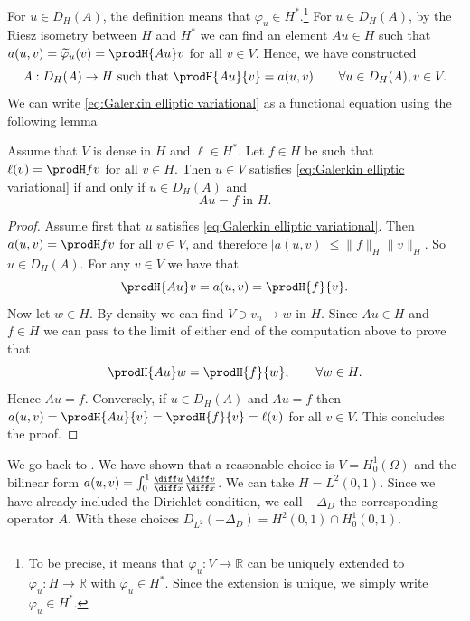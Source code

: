 For $u \in D_H(A)$, the definition means that $\varphi_u \in H^*$.\footnote{To be precise, it means that $\varphi_u : V \to \mathbb R$ can be uniquely extended to $ \widetilde \varphi_u : H \to \mathbb R$ with $\widetilde \varphi_u \in H^*$. Since the extension is unique, we simply write $\varphi_u \in H^*$.}
For $u \in D_H(A)$, by the Riesz isometry between $H$ and $H^*$ we can find an element $Au \in H$ such that $a(u,v) = \widetilde \varphi_u(v) = \prodH {Au} v$ for all $v \in V$. Hence, we have constructed
\begin{equation*}
    A : D_H(A) \to H \text{ such that } \prodH {Au}{v} = a(u,v) \qquad \forall u \in D_H(A), v \in V.
\end{equation*}
We can write \eqref{eq:Galerkin elliptic variational} as a functional equation using the following lemma
\begin{lemma}
    Assume that $V$ is dense in $H$ and
    $\ell \in H^*$.
    Let $f \in H$ be such that $\ell(v) = \prodH f v$ for all $v \in H$.
    Then $u \in V$ satisfies \eqref{eq:Galerkin elliptic variational} if and only if $u \in D_H (A)$ and
    \begin{equation}
        A u = f \text{ in } H.
    \end{equation}
\end{lemma}
\begin{proof}
    Assume first that $u$ satisfies \eqref{eq:Galerkin elliptic variational}. Then $a(u,v) = \prodH fv$ for all $v \in V$, and therefore $|a(u,v)| \le \|f\|_H \|v\|_H$. So $u \in D_H(A)$. For any $v \in V$ we have that
    \begin{equation*}
        \prodH {Au} v = a(u,v) = \prodH{f}{v}.
    \end{equation*}
    Now let $w \in H$. By density we can find $V \ni v_n \to w$ in $H$. Since $Au \in H$ and $f \in H$ we can pass to the limit of either end of the computation above to prove that
    \begin{equation*}
        \prodH{Au} w = \prodH{f}{w},\qquad \forall w \in H.
    \end{equation*}
    Hence $Au = f$. Conversely, if $u \in D_H(A)$ and $Au = f$ then $a(u,v) = \prodH{Au}{v} = \prodH{f}{v} = \ell(v)$ for all $v \in V$.
    This concludes the proof.
\end{proof}

\begin{example}
    \label{example:Dirichlet Laplacian}
    We go back to .
    We have shown that a reasonable choice is $V = H_0^1 (\Omega)$
    and the bilinear form $a(u,v) = \int_0^1 \frac{\diff u}{\diff x} \frac{\diff v}{\diff x}$.
    We can take $H = L^2 (0,1)$.
    Since we have already included the Dirichlet condition, we call $-\Delta_D$ the corresponding operator $A$.
    With these choices $D_{L^2}(-\Delta_D) = H^2 (0,1) \cap H_0^1 (0,1)$.
\end{example}
